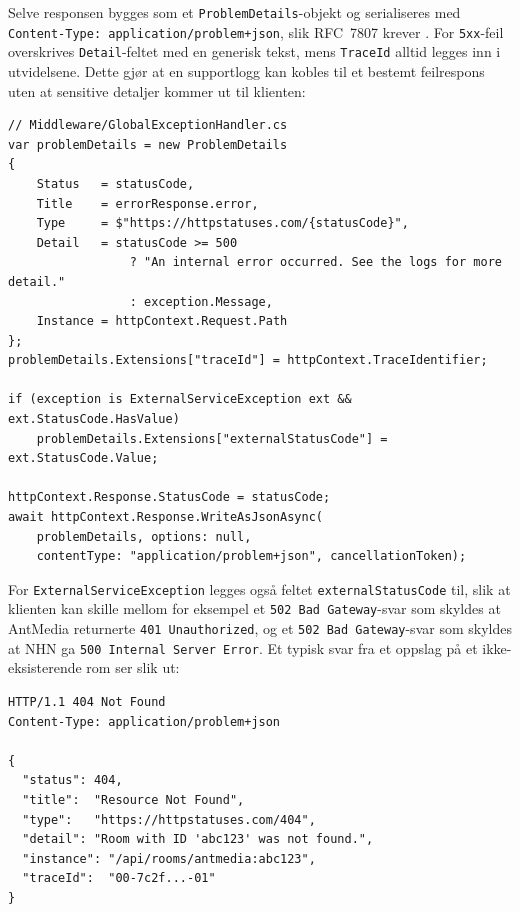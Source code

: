 Selve responsen bygges som et \texttt{ProblemDetails}-objekt og serialiseres med \texttt{Content-Type: application/problem+json}, slik RFC~7807 krever \cite{rfc7807}. For \texttt{5xx}-feil overskrives \texttt{Detail}-feltet med en generisk tekst, mens \texttt{TraceId} alltid legges inn i utvidelsene. Dette gjør at en supportlogg kan kobles til et bestemt feilrespons uten at sensitive detaljer kommer ut til klienten:

\begin{lstlisting}[language={[Sharp]C}, caption={Bygging av ProblemDetails-respons.}, label={lst:problemdetails}]
// Middleware/GlobalExceptionHandler.cs
var problemDetails = new ProblemDetails
{
    Status   = statusCode,
    Title    = errorResponse.error,
    Type     = $"https://httpstatuses.com/{statusCode}",
    Detail   = statusCode >= 500
                 ? "An internal error occurred. See the logs for more detail."
                 : exception.Message,
    Instance = httpContext.Request.Path
};
problemDetails.Extensions["traceId"] = httpContext.TraceIdentifier;

if (exception is ExternalServiceException ext && ext.StatusCode.HasValue)
    problemDetails.Extensions["externalStatusCode"] = ext.StatusCode.Value;

httpContext.Response.StatusCode = statusCode;
await httpContext.Response.WriteAsJsonAsync(
    problemDetails, options: null,
    contentType: "application/problem+json", cancellationToken);
\end{lstlisting}

For \texttt{ExternalServiceException} legges også feltet \texttt{externalStatusCode} til, slik at klienten kan skille mellom for eksempel et \texttt{502 Bad Gateway}-svar som skyldes at AntMedia returnerte \texttt{401 Unauthorized}, og et \texttt{502 Bad Gateway}-svar som skyldes at NHN ga \texttt{500 Internal Server Error}. Et typisk svar fra et oppslag på et ikke-eksisterende rom ser slik ut:

\begin{lstlisting}[caption={Eksempel på Problem Details-respons fra API-et (HTTP 404).}, label={lst:problem-example}]
HTTP/1.1 404 Not Found
Content-Type: application/problem+json

{
  "status": 404,
  "title":  "Resource Not Found",
  "type":   "https://httpstatuses.com/404",
  "detail": "Room with ID 'abc123' was not found.",
  "instance": "/api/rooms/antmedia:abc123",
  "traceId":  "00-7c2f...-01"
}
\end{lstlisting}

